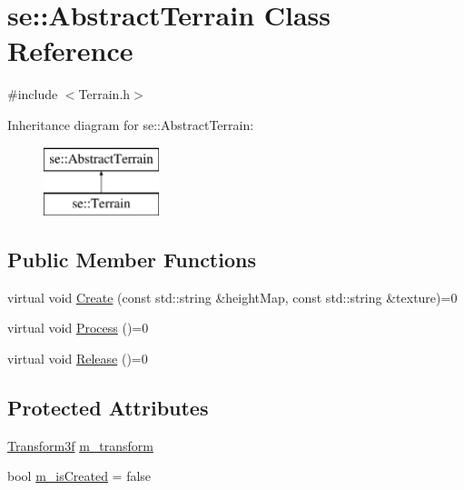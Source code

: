 \hypertarget{classse_1_1_abstract_terrain}{}\section{se\+:\+:Abstract\+Terrain Class Reference}
\label{classse_1_1_abstract_terrain}


{\ttfamily \#include $<$Terrain.\+h$>$}

Inheritance diagram for se\+:\+:Abstract\+Terrain\+:\begin{figure}[H]
\begin{center}
\leavevmode
\includegraphics[height=2.000000cm]{classse_1_1_abstract_terrain}
\end{center}
\end{figure}
\subsection*{Public Member Functions}
\begin{DoxyCompactItemize}
\item 
virtual void \mbox{\hyperlink{classse_1_1_abstract_terrain_ac8254489e68bcfc1960b968afeb683b0}{Create}} (const std\+::string \&height\+Map, const std\+::string \&texture)=0
\item 
virtual void \mbox{\hyperlink{classse_1_1_abstract_terrain_af2f0249eead2b62a82baa2ecbb52efeb}{Process}} ()=0
\item 
virtual void \mbox{\hyperlink{classse_1_1_abstract_terrain_aeee5b6c81be6aee211819b8d79718bf5}{Release}} ()=0
\end{DoxyCompactItemize}
\subsection*{Protected Attributes}
\begin{DoxyCompactItemize}
\item 
\mbox{\hyperlink{classse_1_1_transform3f}{Transform3f}} \mbox{\hyperlink{classse_1_1_abstract_terrain_a14845c9ab079d2c3fe3a70918b133c00}{m\+\_\+transform}}
\item 
bool \mbox{\hyperlink{classse_1_1_abstract_terrain_aad74a68f788394ddf5d88a0771a60248}{m\+\_\+is\+Created}} = false
\end{DoxyCompactItemize}


